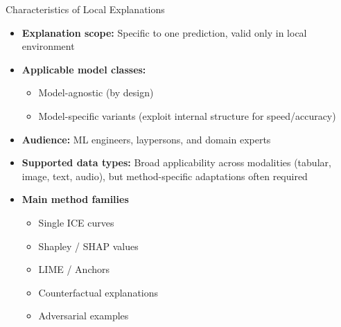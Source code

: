\documentclass[10pt,compress,t,notes=noshow, xcolor=table]{beamer}
\begin{document}
\begin{frame}[t]{Characteristics of Local Explanations}
	\begin{itemize}
		\item<1-> \textbf{Explanation scope:} Specific to one prediction, valid only in local environment
		\item<2-> \textbf{Applicable model classes:} 
                    \begin{itemize}
                \item Model-agnostic (by design)
                \item Model-specific variants (exploit internal structure for speed/accuracy)%
              \end{itemize}
		\item<3-> \textbf{Audience:} ML engineers, laypersons, and domain experts
		\item<4-> \textbf{Supported data types:} Broad applicability across modalities (tabular, image, text, audio), but method-specific adaptations often required
		\item<5-> \textbf{Main method families}
              \begin{itemize}
                \item Single ICE curves
                \item Shapley / SHAP values
                \item LIME / Anchors
                \item Counterfactual explanations
                \item Adversarial examples
              \end{itemize}
	\end{itemize}
\end{frame}
\end{document}
